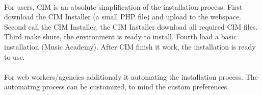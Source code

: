 \paragraph{}
For users, CIM is an absolute simplification of the installation process.
First download the CIM Installer (a small PHP file) and upload to the webspace.
Second call the CIM Installer, the CIM Installer download all required CIM files.
Third make shure, the environment is ready to install.
Fourth load a basic installation (Music Academy).
After CIM finish it work, the installation is ready to use.

\paragraph{}
For web workers/agencies additionaly it automating the installation process.
The automating process can be customized, to mind the custom preferences.
